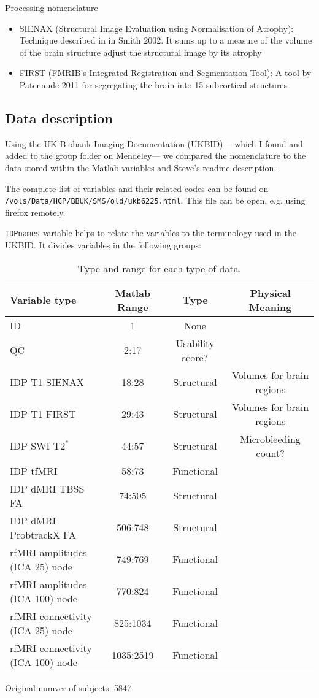 \documentclass{article}
\begin{document}
Processing nomenclature
\begin{itemize}
\item SIENAX (Structural Image Evaluation using Normalisation of Atrophy): Technique described in in Smith 2002. It sums up to a measure of the volume of the brain structure adjust the structural image by its atrophy 
  \item FIRST (FMRIB's Integrated Registration and Segmentation Tool): A tool by Patenaude 2011 for segregating the brain into 15 subcortical structures
\end{itemize}

\subsection{Data description\label{data}}

Using the UK Biobank Imaging Documentation (UKBID) ---which I found and added to the group folder on Mendeley--- we compared the nomenclature to the data stored within the Matlab variables and Steve's readme description.

The complete list of variables and their related codes can be found on {\tt /vols/Data/HCP/BBUK/SMS/old/ukb6225.html}. This file can be open, e.g. using firefox remotely.

{\tt IDPnames} variable helps to relate the variables to the terminology used in the UKBID. It divides variables in the following groups:
\begin{table}
  \begin{tabular}{lccc}
    \toprule
    {\bf Variable type} & {\bf Matlab Range} & {\bf Type} &{\bf Physical Meaning}\\
    \midrule
    ID  & 1 & None \\
    QC  & 2:17 & Usability score?\\
    IDP T1 SIENAX & 18:28 & Structural & Volumes for brain regions\\
    IDP T1 FIRST & 29:43 & Structural & Volumes for brain regions\\
    IDP SWI $\text{T2}^{*}$ & 44:57 & Structural & Microbleeding count?\\
    IDP tfMRI & 58:73 & Functional & \\
    IDP dMRI TBSS FA & 74:505 & Structural & \\
    IDP dMRI ProbtrackX FA & 506:748 & Structural & \\
    rfMRI amplitudes (ICA 25) node    & 749:769 & Functional &\\
    rfMRI amplitudes (ICA 100) node   & 770:824 & Functional &\\
    rfMRI connectivity (ICA 25) node  & 825:1034 & Functional &\\
    rfMRI connectivity (ICA 100) node & 1035:2519 & Functional &\\
    \bottomrule
  \end{tabular}
  \caption{Type and range for each type of data.}
  \label{tab:data-ranges}
\end{table}
Original numver of subjects: 5847
\end{document}
